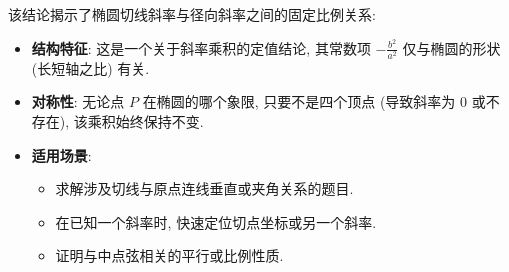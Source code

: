 \begin{explanationbox}
该结论揭示了椭圆切线斜率与径向斜率之间的固定比例关系:
\begin{itemize}
    \item \textbf{结构特征}: 这是一个关于斜率乘积的定值结论, 其常数项 $-\frac{b^2}{a^2}$ 仅与椭圆的形状 (长短轴之比) 有关.
    \item \textbf{对称性}: 无论点 $P$ 在椭圆的哪个象限, 只要不是四个顶点 (导致斜率为 $0$ 或不存在), 该乘积始终保持不变.
    \item \textbf{适用场景}:
    \begin{itemize}
        \item 求解涉及切线与原点连线垂直或夹角关系的题目.
        \item 在已知一个斜率时, 快速定位切点坐标或另一个斜率.
        \item 证明与中点弦相关的平行或比例性质.
    \end{itemize}
\end{itemize}
\end{explanationbox}